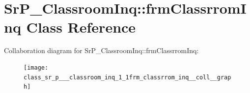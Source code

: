 \hypertarget{class_sr_p___classroom_inq_1_1frm_classrrom_inq}{
\section{\-Sr\-P\-\_\-\-Classroom\-Inq\-:\-:frm\-Classrrom\-Inq \-Class \-Reference}
\label{class_sr_p___classroom_inq_1_1frm_classrrom_inq}
}


\-Collaboration diagram for \-Sr\-P\-\_\-\-Classroom\-Inq\-:\-:frm\-Classrrom\-Inq\-:
\nopagebreak
\begin{figure}[H]
\begin{center}
\leavevmode
\texttt{[image: class\_sr\_p\_\_\_classroom\_inq\_1\_1frm\_classrrom\_inq\_\_coll\_\_graph]}
\end{center}
\end{figure}
